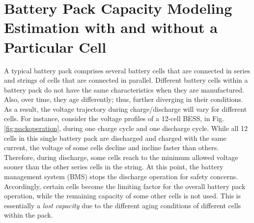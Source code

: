 \documentclass[10pt,twocolumn]{IEEEtran}
\begin{document}



\section{Battery Pack Capacity Modeling Estimation with and without a Particular Cell}

A typical battery pack comprises several battery  cells that are connected in series and strings of cells that are connected in parallel. 
Different battery  cells within a battery pack do not have the same characteristics when they are manufactured.
 Also, over time, they age differently; thus, further  diverging in their  conditions.
As a result,  the voltage trajectory during charge/discharge will vary for different cells.
For instance, consider the voltage profiles of a 12-cell BESS,   in Fig. \ref{fig:packoperation}, during one charge  cycle and one discharge cycle.
While all 12 cells in this single battery pack are discharged and charged with the same current, the voltage of some cells decline and incline faster than others.
%
%
Therefore, during discharge, some cells  reach to the minimum allowed voltage sooner than the other series cells in the  string.
At this point,  the battery management system (BMS) stops the discharge operation for safety concerns.
Accordingly, certain cells become the limiting factor for the overall  battery pack operation, 
while the remaining capacity of some other cells is not used. 
This is essentially a \emph{lost capacity} due to the different aging conditions of different cells within the pack. 
\end{document}
